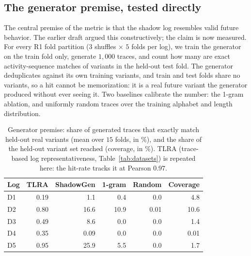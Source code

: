 \documentclass[runningheads]{llncs}
\begin{document}
{\color{chgblue}
\subsection{The generator premise, tested directly}
\label{sec:eval:genval}
The central premise of the metric is that the shadow log resembles valid future behavior. The earlier draft argued this constructively; the claim is now measured. For every R1 fold partition ($3$ shuffles $\times$ $5$ folds per log), we train the generator on the train fold only, generate $1{,}000$ traces, and count how many are exact activity-sequence matches of variants in the held-out test fold. The generator deduplicates against its own training variants, and train and test folds share no variants, so a hit cannot be memorization: it is a real future variant the generator produced without ever seeing it. Two baselines calibrate the number: the 1-gram ablation, and uniformly random traces over the training alphabet and length distribution.

\begin{table}[t]
\centering
\caption{Generator premise: share of generated traces that exactly match held-out real variants (mean over $15$ folds, in \%), and the share of the held-out variant set reached (coverage, in \%). TLRA (trace-based log representativeness, Table~\ref{tab:datasets}) is repeated here: the hit-rate tracks it at Pearson $0.97$.}
\label{tab:genval}
\setlength{\tabcolsep}{5pt}
\footnotesize
\begin{tabular}{@{}lrrrrr@{}}
\toprule
Log & TLRA & ShadowGen & 1-gram & Random & Coverage \\
\midrule
D1 & 0.19 & 1.1 & 0.4 & 0.0 & 4.8 \\
D2 & 0.80 & 16.6 & 10.9 & 0.01 & 10.6 \\
D3 & 0.49 & 8.6 & 0.0 & 0.0 & 1.4 \\
D4 & 0.35 & 0.09 & 0.0 & 0.0 & 0.01 \\
D5 & 0.95 & 25.9 & 5.5 & 0.0 & 1.7 \\
\bottomrule
\end{tabular}
\end{table}

}
\end{document}
